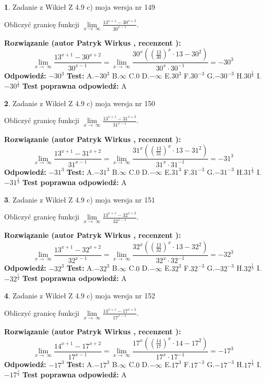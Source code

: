 \documentclass[12pt, a4paper]{article}
\theoremstyle{definition} %
\newtheorem{zad}{}
\newcommand{\zadStart}[1]{\begin{zad}#1\newline}
\newcommand{\zadStop}{\end{zad}}
\newcommand{\rozwStart}[2]{\noindent \textbf{Rozwiązanie (autor #1 , recenzent #2): }\newline}
\newcommand{\rozwStop}{\newline}
\newcommand{\odpStart}{\noindent \textbf{Odpowiedź:}\newline}
\newcommand{\odpStop}{\newline}
\newcommand{\testStart}{\noindent \textbf{Test:}\newline}
\newcommand{\testStop}{\newline}
\newcommand{\kluczStart}{\noindent \textbf{Test poprawna odpowiedź:}\newline}
\newcommand{\kluczStop}{\newline}
\begin{document}
\zadStart{Zadanie z Wikieł Z 4.9 c) moja wersja nr 149}


Obliczyć granicę funkcji  $\lim\limits_{x\to\ \infty}\frac{13^{x+1}-30^{x+2}}{30^{x-1}}$.
\zadStop
\rozwStart{Patryk Wirkus}{}
$$\lim\limits_{x\to\ \infty}\frac{13^{x+1}-30^{x+2}}{30^{x-1}}=\lim\limits_{x\to\ \infty}\frac{30^{x}((\frac{13}{30})^{x}\cdot 13 -30^{2})}{30^{x}\cdot 30^{-1}} = -30^{3}$$
\rozwStop
\odpStart
$-30^{3}$
\odpStop
\testStart
A.$-30^{3}$ B.$\infty$ C.$0$ D.$-\infty$ E.$30^{3}$
F.$30^{-3}$ G.$-30^{-3}$
H.$30^{\frac{1}{3}}$
I.$-30^{\frac{1}{3}}$
\testStop
\kluczStart
A
\kluczStop



\zadStart{Zadanie z Wikieł Z 4.9 c) moja wersja nr 150}


Obliczyć granicę funkcji  $\lim\limits_{x\to\ \infty}\frac{13^{x+1}-31^{x+2}}{31^{x-1}}$.
\zadStop
\rozwStart{Patryk Wirkus}{}
$$\lim\limits_{x\to\ \infty}\frac{13^{x+1}-31^{x+2}}{31^{x-1}}=\lim\limits_{x\to\ \infty}\frac{31^{x}((\frac{13}{31})^{x}\cdot 13 -31^{2})}{31^{x}\cdot 31^{-1}} = -31^{3}$$
\rozwStop
\odpStart
$-31^{3}$
\odpStop
\testStart
A.$-31^{3}$ B.$\infty$ C.$0$ D.$-\infty$ E.$31^{3}$
F.$31^{-3}$ G.$-31^{-3}$
H.$31^{\frac{1}{3}}$
I.$-31^{\frac{1}{3}}$
\testStop
\kluczStart
A
\kluczStop



\zadStart{Zadanie z Wikieł Z 4.9 c) moja wersja nr 151}


Obliczyć granicę funkcji  $\lim\limits_{x\to\ \infty}\frac{13^{x+1}-32^{x+2}}{32^{x-1}}$.
\zadStop
\rozwStart{Patryk Wirkus}{}
$$\lim\limits_{x\to\ \infty}\frac{13^{x+1}-32^{x+2}}{32^{x-1}}=\lim\limits_{x\to\ \infty}\frac{32^{x}((\frac{13}{32})^{x}\cdot 13 -32^{2})}{32^{x}\cdot 32^{-1}} = -32^{3}$$
\rozwStop
\odpStart
$-32^{3}$
\odpStop
\testStart
A.$-32^{3}$ B.$\infty$ C.$0$ D.$-\infty$ E.$32^{3}$
F.$32^{-3}$ G.$-32^{-3}$
H.$32^{\frac{1}{3}}$
I.$-32^{\frac{1}{3}}$
\testStop
\kluczStart
A
\kluczStop



\zadStart{Zadanie z Wikieł Z 4.9 c) moja wersja nr 152}


Obliczyć granicę funkcji  $\lim\limits_{x\to\ \infty}\frac{14^{x+1}-17^{x+2}}{17^{x-1}}$.
\zadStop
\rozwStart{Patryk Wirkus}{}
$$\lim\limits_{x\to\ \infty}\frac{14^{x+1}-17^{x+2}}{17^{x-1}}=\lim\limits_{x\to\ \infty}\frac{17^{x}((\frac{14}{17})^{x}\cdot 14 -17^{2})}{17^{x}\cdot 17^{-1}} = -17^{3}$$
\rozwStop
\odpStart
$-17^{3}$
\odpStop
\testStart
A.$-17^{3}$ B.$\infty$ C.$0$ D.$-\infty$ E.$17^{3}$
F.$17^{-3}$ G.$-17^{-3}$
H.$17^{\frac{1}{3}}$
I.$-17^{\frac{1}{3}}$
\testStop
\kluczStart
A
\kluczStop
\end{document}
